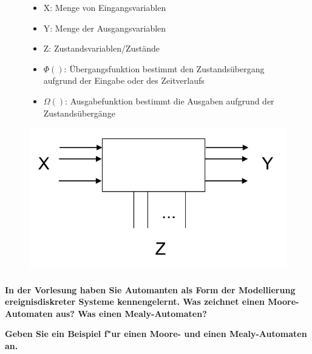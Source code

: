 \begin{figure}[H]
    \centering
    \begin{minipage}{.4\linewidth}
        \begin{itemize}
            \item X: Menge von Eingangsvariablen
            \item Y: Menge der Ausgangsvariablen
            \item Z: Zustandsvariablen/Zustände
            \item $\Phi()$: Übergangsfunktion bestimmt den Zustandsübergang aufgrund der Eingabe oder des Zeitverlaufs
            \item $\Omega()$: Ausgabefunktion bestimmt die Ausgaben aufgrund der Zustandsübergänge
        \end{itemize}
    \end{minipage}
    \begin{minipage}{.5\linewidth}
        \centering
        \includegraphics[width=.99\linewidth]{Graphics/Ereignisdiskrete_Systeme.png}
    \end{minipage}
\end{figure}

\subsubsection{}
\textbf{In der Vorlesung haben Sie Automanten als Form der Modellierung ereignisdiskreter Systeme kennengelernt. Was zeichnet einen Moore-Automaten aus? Was einen Mealy-Automaten?}

\textbf{Geben Sie ein Beispiel f"ur einen Moore- und einen Mealy-Automaten an.}

